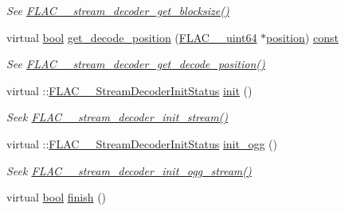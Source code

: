 \begin{DoxyCompactItemize}
\begin{DoxyCompactList}\small\item\em See \hyperlink{group__flac__stream__decoder_ga9cd4807f4c6ee90338d271048fb28223}{F\+L\+A\+C\+\_\+\+\_\+stream\+\_\+decoder\+\_\+get\+\_\+blocksize()} \end{DoxyCompactList}\item 
virtual \hyperlink{mac_2config_2i386_2lib-src_2libsoxr_2soxr-config_8h_abb452686968e48b67397da5f97445f5b}{bool} \hyperlink{class_f_l_a_c_1_1_decoder_1_1_stream_af4fbbdd0ea096a77037f1d53dcade7f1}{get\+\_\+decode\+\_\+position} (\hyperlink{ordinals_8h_aa78c8c70a3eb8a58af7436f278acde8e}{F\+L\+A\+C\+\_\+\+\_\+uint64} $\ast$\hyperlink{structposition}{position}) \hyperlink{getopt1_8c_a2c212835823e3c54a8ab6d95c652660e}{const} 
\begin{DoxyCompactList}\small\item\em See \hyperlink{group__flac__stream__decoder_ga11507d25b6fdbd1efd5ee642923730fa}{F\+L\+A\+C\+\_\+\+\_\+stream\+\_\+decoder\+\_\+get\+\_\+decode\+\_\+position()} \end{DoxyCompactList}\item 
virtual \+::\hyperlink{group__flac__stream__decoder_gaaed54a24ac6310d29c5cafba79759c44}{F\+L\+A\+C\+\_\+\+\_\+\+Stream\+Decoder\+Init\+Status} \hyperlink{class_f_l_a_c_1_1_decoder_1_1_stream_a5267433117fbed17e11498856d881335}{init} ()
\begin{DoxyCompactList}\small\item\em Seek \hyperlink{group__flac__stream__decoder_ga32c28a56a2bdfa2333edbd3d991894d7}{F\+L\+A\+C\+\_\+\+\_\+stream\+\_\+decoder\+\_\+init\+\_\+stream()} \end{DoxyCompactList}\item 
virtual \+::\hyperlink{group__flac__stream__decoder_gaaed54a24ac6310d29c5cafba79759c44}{F\+L\+A\+C\+\_\+\+\_\+\+Stream\+Decoder\+Init\+Status} \hyperlink{class_f_l_a_c_1_1_decoder_1_1_stream_a5dcd3a0ed3192a793d058e6d270078ed}{init\+\_\+ogg} ()
\begin{DoxyCompactList}\small\item\em Seek \hyperlink{group__flac__stream__decoder_ga78bf285b54e5aaee73a214c108683a72}{F\+L\+A\+C\+\_\+\+\_\+stream\+\_\+decoder\+\_\+init\+\_\+ogg\+\_\+stream()} \end{DoxyCompactList}\item 
virtual \hyperlink{mac_2config_2i386_2lib-src_2libsoxr_2soxr-config_8h_abb452686968e48b67397da5f97445f5b}{bool} \hyperlink{class_f_l_a_c_1_1_decoder_1_1_stream_a90a50edc0c4544df1ef0040cf3869234}{finish} ()

\end{DoxyCompactItemize}
